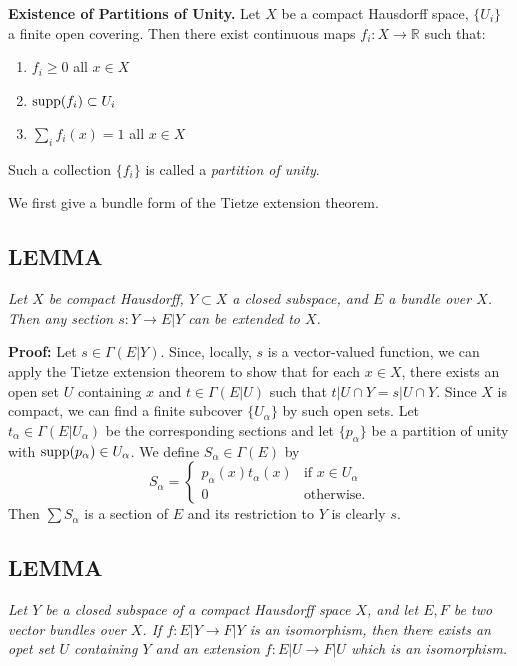 \textbf{Existence of Partitions of Unity.} Let $X$ be a compact Hausdorff space, $\{U_i\}$ a finite open covering. Then there exist continuous maps $f_i : X \to \mathbb{R}$ such that:
\begin{enumerate}
    \item $f_i \geq 0$ \qquad all $x \in X$
    \item $\operatorname{supp} (f_i) \subset U_i$
    \item $\sum_i f_i(x) = 1$ \qquad all $x \in X$
\end{enumerate}

Such a collection $\{f_i\}$ is called a \textit{partition of unity}. \par
We first give a bundle form of the Tietze extension theorem. \par

\subsection{LEMMA}\label{lem:1.4.1} \textit{Let $X$ be compact Hausdorff, $Y \subset X$ a closed subspace, and $E$ a bundle over $X$. Then any section $s: Y \to E \vert Y$ can be extended to $X$.} \par 

\textbf{Proof:} Let $s \in \Gamma(E \vert Y)$. Since, locally, $s$ is a vector-valued function, we can apply the Tietze extension theorem to show that for each $x \in X$, there exists an open set $U$ containing $x$ and $t \in \Gamma(E \vert U)$ such that $t \vert U \cap Y = s \vert U \cap Y$. Since $X$ is compact, we can find a finite subcover $\{U_\alpha \}$ by such open sets. Let $t_\alpha \in \Gamma(E \vert U_\alpha)$ be the corresponding sections and let $\{p_\alpha\}$ be a partition of unity with $\operatorname{supp}(p_\alpha) \in U_\alpha$. We define $S_\alpha \in \Gamma(E)$ by
\begin{equation*}
S_\alpha =
    \begin{cases}
        p_\alpha(x) t_\alpha(x) & \text{if $x \in U_\alpha$} \\
        0 & \text{otherwise.}
    \end{cases}
\end{equation*}
Then $\sum S_\alpha$ is a section of $E$ and its restriction to $Y$ is clearly $s$.

\subsection{LEMMA}\label{lem:1.4.2} \textit{Let $Y$ be a closed subspace of a compact Hausdorff space $X$, and let $E, F$ be two vector bundles over $X$. If $f: E \vert Y \to F \vert Y$ is an isomorphism, then there exists an opet set $U$ containing $Y$ and an extension $f: E \vert U \to F \vert U$ which is an isomorphism.} \par 

